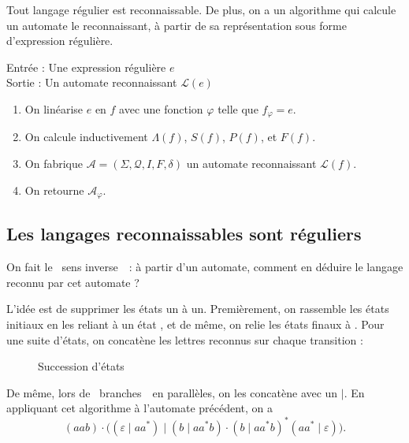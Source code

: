 \begin{thm}
	Tout langage régulier est reconnaissable.
	De plus, on a un algorithme qui calcule un automate le reconnaissant, à partir de sa représentation sous forme d'expression régulière.
\end{thm}

\begin{algo}
	Entrée : Une expression régulière $e$\/ \\
	Sortie : Un automate reconnaissant $\mathcal{L}(e)$\/ \\
	\begin{enumerate}
		\item On linéarise $e$\/ en $f$\/ avec une fonction $\varphi$\/ telle que $f_\varphi = e$.
		\item On calcule inductivement $\Lambda(f)$, $S(f)$, $P(f)$, et $F(f)$.
		\item On fabrique $\mathcal{A} = (\Sigma, \mathcal{Q}, I, F, \delta)$\/ un automate reconnaissant $\mathcal{L}(f)$.
		\item On retourne $\mathcal{A}_\varphi$.
	\end{enumerate}
\end{algo}

\subsection{Les langages reconnaissables sont réguliers}

On fait le \guillemotleft~sens inverse~\guillemotright\ : à partir d'un automate, comment en déduire le langage reconnu par cet automate ?

L'idée est de supprimer les états un à un.
Premièrement, on rassemble les états initiaux en les reliant à un état {}, et de même, on relie les états finaux à {}.
Pour une suite d'états, on concatène les lettres reconnus sur chaque transition :
\begin{figure}[H]
	\centering
	\caption{Succession d'états}
\end{figure}
De même, lors de \guillemotleft~branches~\guillemotright\ en parallèles, on les concatène avec un $ \mid $.
En appliquant cet algorithme à l'automate précédent, on a \[
	(aab)  \cdot \Big((\varepsilon \mid aa^*)  \mid (b \mid aa^*b)\cdot (b \mid aa^*b)^* (aa^* \mid \varepsilon)\Big)
.\]

